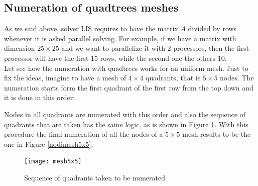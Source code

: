 \subsection{Numeration of quadtrees meshes}
As we said above, solver LIS requires to have the matrix $ A $ divided by rows whenever it is asked parallel solving. For example, if we have a matrix with dimension $ 25 \times 25 $ and we want to parallelize it with 2 processors, then the first processor will have the first 15 rows, while the second one the others 10. \\
Let see how the numeration with quadtrees works for an uniform mesh. Just to fix the ideas, imagine to have a mesh of $ 4 \times 4 $ quadrants, that is $ 5 \times 5 $ nodes. The numeration starts form the first quadrant of the first row from the top down and it is done in this order: \\
\begin{center}
\end{center}
Nodes in all quadrants are numerated with this order and also the sequence of quadrants that are taken has the same logic, as is shown in Figure \ref{mesh5x5}. With this procedure the final numeration of all the nodes of a $ 5 \times 5 $  mesh results to be the one in Figure \ref{nodimesh5x5}.
\begin{figure}[h]
	\centering
	\texttt{[image: mesh5x5]}
	\caption[Sequence of quadrants taken with quadtrees numetation for a mesh $ 5\times 5 $]{Sequence of quadrants taken to be numerated}
	\label{mesh5x5}
\end{figure}

